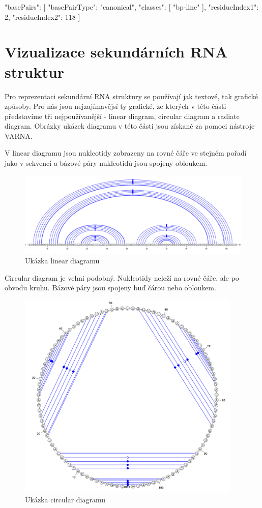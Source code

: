 \begin{code} 
{ 
  "basePairs": 
  [ 
    { 
      "basePairType": "canonical", 
      "classes": 
      [
        "bp-line" 
      ], 
      "residueIndex1": 2, 
      "residueIndex2": 118 
    } 
  ]    
} 
\end{code}

\section{Vizualizace sekundárních RNA struktur} 

Pro reprezentaci sekundární RNA struktury se používají jak textové, tak
grafické způsoby. Pro nás jsou nejzajímavějsí ty grafické, ze kterých v této
části představíme tři nejpoužívanější - linear diagram, circular diagram a
radiate diagram. Obrázky ukázek diagramu v této části jsou získané za pomoci nástroje
VARNA\cite{Varna}.

V linear diagramu jsou nukleotidy zobrazeny na rovné čáře ve stejném pořadí jako v
sekvenci a bázové páry nukleotidů jsou spojeny obloukem.

\begin{figure}[H]
  \centering
  \includegraphics[width=140mm]{../img/linear.png}
  \caption{Ukázka linear diagramu}
\end{figure}

Circular diagram je velmi podobný. Nukleotidy neleží na rovné čáře, ale po
obvodu kruhu. Bázové páry jsou spojeny buď čárou nebo obloukem.

\begin{figure}[H]
  \centering
  \includegraphics[height=100mm]{../img/circular.png}
  \caption{Ukázka circular diagramu}
\end{figure}

